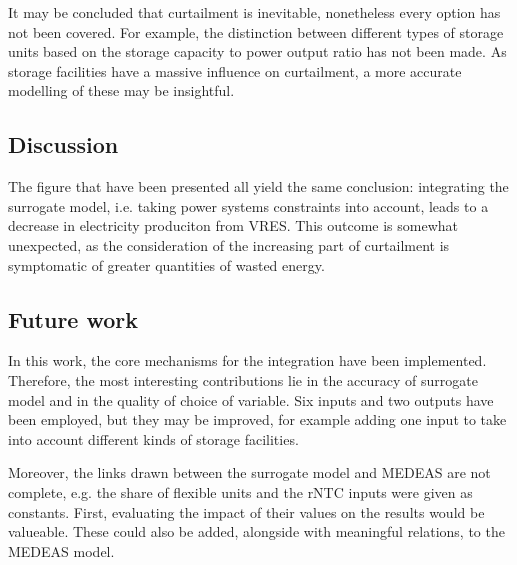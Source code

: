It may be concluded that curtailment is inevitable, nonetheless every option has not been covered. For example, the distinction between different types of storage units based on the storage capacity to power output ratio has not been made. As storage facilities have a massive influence on curtailment, a more accurate modelling of these may be insightful.

\subsection{Discussion}

The figure that have been presented all yield the same conclusion: integrating the surrogate model, i.e. taking power systems constraints into account, leads to a decrease in electricity produciton from VRES. This outcome is somewhat unexpected, as the consideration of the increasing part of curtailment is symptomatic of greater quantities of wasted energy.

\subsection{Future work}

In this work, the core mechanisms for the integration have been implemented. Therefore, the most interesting contributions lie in the accuracy of surrogate model and in the quality of choice of variable. Six inputs and two outputs have been employed, but they may be improved, for example adding one input to take into account different kinds of storage facilities.

Moreover, the links drawn between the surrogate model and MEDEAS are not complete, e.g. the share of flexible units and the rNTC inputs were given as constants. First, evaluating the impact of their values on the results would be valueable. These could also be added, alongside with meaningful relations, to the MEDEAS model.



